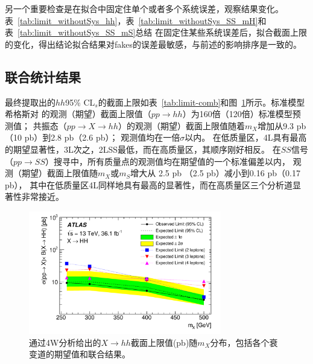 另一个重要检查是在拟合中固定住单个或者多个系统误差，观察结果变化。表~\ref{tab:limit_withoutSys_hh}，表~\ref{tab:limit_withoutSys_SS_mH}和表~\ref{tab:limit_withoutSys_SS_mS}总结
在固定住某些系统误差后，拟合截面上限的变化，得出结论拟合结果对fakes的误差最敏感，与前述的影响排序是一致的。

\clearpage

\subsection{联合统计结果}
最终提取出的$hh$95\% CL$_s$的截面上限如表~\ref{tab:limit-comb}和图~\ref{fig:limit-comb}所示。标准模型希格斯对
的观测（期望）截面上限值（$pp\rightarrow hh$）为160倍（120倍）标准模型预测值；
共振态（$pp\rightarrow X\rightarrow hh$）的观测（期望）截面上限值随着$m_X$增加从9.3 pb（10 pb）到2.8 pb（2.6 pb）；
观测值均在一倍$\sigma$以内。
在低质量区，4L具有最高的期望显著性，3L次之，2LSS最低，而在高质量区，其顺序刚好相反。
在$SS$信号（$pp\rightarrow SS$）搜寻中，所有质量点的观测值均在期望值的一个标准偏差以内，
观测（期望）截面上限值随$m_X$或$m_S$增大从
2.5 pb （2.5 pb）减小到0.16 pb（0.17 pb），
其中在低质量区4L同样地具有最高的显著性，而在高质量区三个分析道显著性非常接近。
\begin{figure}[!h!tpb]
  \centering
 \includegraphics[width=0.75\textwidth]{fig/4W-Paper-36ifb_Paper_figures_limits_limit-comb-hh-AllSys.pdf}
\caption{通过4W分析给出的$X\rightarrow hh$截面上限值(pb)随$m_X$分布，包括各个衰变道的期望值和联合结果。}
 \label{fig:limit-comb}
\end{figure}
